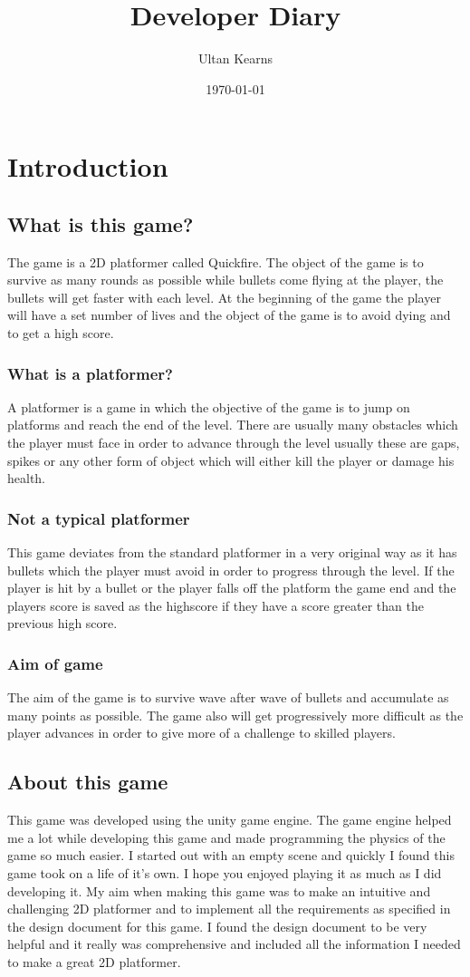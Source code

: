 \documentclass{report}
\title{Developer Diary}
\author{Ultan Kearns}
\date{\today}
\begin{document}
\maketitle
\tableofcontents
\chapter{Introduction}
\section{What is this game?}
The game is a 2D platformer called Quickfire.  
The object of the game is 
to survive as many rounds as possible while bullets come flying at the player, the bullets will get faster with each level. At the beginning of the game the player will have a set number of lives and the object of the game is to avoid dying and to get a high score.
\subsection{What is a platformer?}
A platformer is a game in which the objective of the game is to jump on platforms and reach the end of the level\cite{Platformer}.  There are usually many obstacles which the player must face in order to advance through the level usually these are gaps, spikes or any other form of object which will either kill the player or damage his health.
\subsection{Not a typical platformer}
This game deviates from the standard platformer\cite{Platformer} in a very original way as it has bullets which the player must avoid in order to progress through the level.  If the player is hit by a bullet or the player falls off the platform the game end and the players score is saved as the highscore if they have a score greater than the previous high score.
\subsection{Aim of game}
The aim of the game is to survive wave after wave of bullets and accumulate as many points as possible.  The game also will get progressively more difficult as the player advances in order to give more of a challenge to skilled players.
\section{About this game}
 This game was developed using the unity game engine.  The game engine helped me a lot while developing this game and made programming the physics of the game so much easier.  I started out with an empty scene and quickly I found this game took on a life of it's own.  I hope you enjoyed playing it as much as I did developing it.  My aim when making this game was to make an intuitive and challenging 2D platformer and to implement all the requirements as specified in the design document for this game.  I found the design document to be very helpful and it really was comprehensive and included all the information I needed to make a great 2D platformer.
\end{document}

